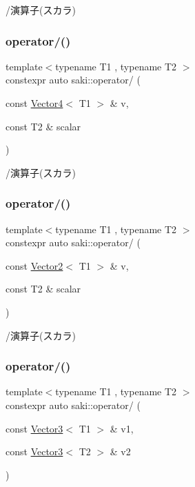 /演算子(スカラ) 

\mbox{\label{namespacesaki_a5170a233051df50d389f8f3453fc0fc2}} 
\subsubsection{\texorpdfstring{operator/()}{operator/()}\hspace{0.1cm}{\footnotesize\ttfamily [3/8]}}
{\footnotesize\ttfamily template$<$typename T1 , typename T2 $>$ \\
constexpr auto saki\+::operator/ (\begin{DoxyParamCaption}\item[{const \mbox{\hyperlink{classsaki_1_1_vector4}{Vector4}}$<$ T1 $>$ \&}]{v,  }\item[{const T2 \&}]{scalar }\end{DoxyParamCaption})}



/演算子(スカラ) 

\mbox{\label{namespacesaki_a43404fc455816a29474cce93fc5cff50}} 
\subsubsection{\texorpdfstring{operator/()}{operator/()}\hspace{0.1cm}{\footnotesize\ttfamily [4/8]}}
{\footnotesize\ttfamily template$<$typename T1 , typename T2 $>$ \\
constexpr auto saki\+::operator/ (\begin{DoxyParamCaption}\item[{const \mbox{\hyperlink{classsaki_1_1_vector2}{Vector2}}$<$ T1 $>$ \&}]{v,  }\item[{const T2 \&}]{scalar }\end{DoxyParamCaption})}



/演算子(スカラ) 

\mbox{\label{namespacesaki_a7af3750f8a88499eca7784ad18753111}} 
\subsubsection{\texorpdfstring{operator/()}{operator/()}\hspace{0.1cm}{\footnotesize\ttfamily [5/8]}}
{\footnotesize\ttfamily template$<$typename T1 , typename T2 $>$ \\
constexpr auto saki\+::operator/ (\begin{DoxyParamCaption}\item[{const \mbox{\hyperlink{classsaki_1_1_vector3}{Vector3}}$<$ T1 $>$ \&}]{v1,  }\item[{const \mbox{\hyperlink{classsaki_1_1_vector3}{Vector3}}$<$ T2 $>$ \&}]{v2 }\end{DoxyParamCaption})}



